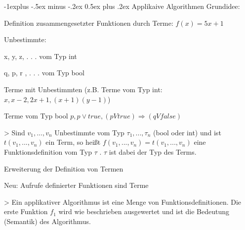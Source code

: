\documentclass[10pt]{article}
\makeatletter
\renewcommand{\subsection}{\@startsection{subsection}{2}{0mm}%
                                {-1explus -.5ex minus -.2ex}%
                                {0.5ex plus .2ex}%
                                {\normalfont\normalsize\bfseries}}
\makeatother
\begin{document}
\subsection{Applikaive Algorithmen}
Grundidee:
\begin{itemize*}
  \item Definition zusammengesetzter Funktionen durch Terme: $f(x) = 5x + 1$
  \item Unbestimmte:
  \begin{itemize*}
    \item x, y, z, . . . vom Typ int
    \item q, p, r , . . . vom Typ bool
  \end{itemize*}
  \item Terme mit Unbestimmten (z.B. Terme vom Typ int: $x, x - 2, 2x + 1, (x + 1)(y - 1)$)
  \item Terme vom Typ bool $p, p \vee true, (p V true) \Rightarrow (q V false)$
\end{itemize*}

> Sind $v_1, ..., v_n$ Unbestimmte vom Typ $\tau_1,...,\tau_n$ (bool oder int) und ist $t(v_1, ..., v_n)$ ein Term, so heißt $f(v_1, ..., v_n) = t(v_1, ..., v_n)$ eine Funktionsdefinition vom Typ $\tau$ . $\tau$ ist dabei der Typ des Terms.

\begin{itemize*}
  \item Erweiterung der Definition von Termen
  \item Neu: Aufrufe definierter Funktionen sind Terme
\end{itemize*}

> Ein applikativer Algorithmus ist eine Menge von Funktionsdefinitionen. Die erste Funktion $f_1$ wird wie beschrieben ausgewertet und ist die Bedeutung (Semantik) des Algorithmus.
\end{document}
